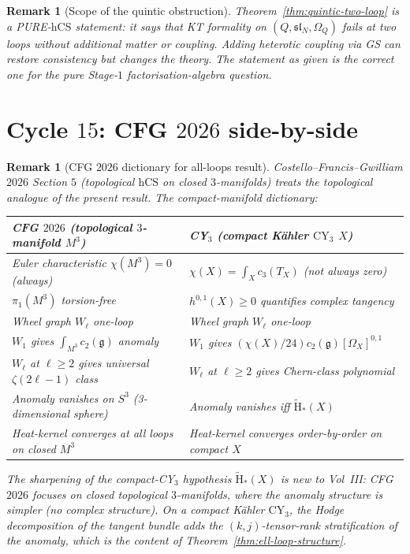 \documentclass[11pt]{article}
\newtheorem{remark}[theorem]{Remark}
\providecommand{\CY}{\mathrm{CY}}
\providecommand{\hCS}{\mathrm{hCS}}
\providecommand{\Om}{\Omega}
\providecommand{\fg}{\mathfrak{g}}
\begin{document}
\begin{remark}[Scope of the quintic obstruction]
\label{rem:quintic-obstruction-scope}
Theorem~\ref{thm:quintic-two-loop} is a PURE-$\hCS$ statement:
it says that KT formality on $(Q, \mathfrak{sl}_N, \Om_Q)$ fails
at two loops without additional matter or coupling.  Adding
heterotic coupling via GS can restore consistency but changes
the theory.  The statement as given is the correct one for the
pure Stage-$1$ factorisation-algebra question.
\end{remark}

\section{Cycle $15$:  CFG $2026$ side-by-side}
\label{sec:cycle-15-cfg}

\begin{remark}[CFG $2026$ dictionary for all-loops result]
\label{rem:cfg-all-loops-dictionary}
Costello--Francis--Gwilliam $2026$ Section $5$ (topological
$\hCS$ on closed $3$-manifolds) treats the topological analogue
of the present result.  The compact-manifold dictionary:
\begin{center}
\begin{tabular}{ll}
CFG $2026$ (topological $3$-manifold $M^3$) & CY$_3$ (compact K\"ahler $\CY_3$ $X$)\\ \hline
Euler characteristic $\chi(M^3) = 0$ (always) & $\chi(X) = \int_X c_3(T_X)$ (not always zero)\\
$\pi_1(M^3)$ torsion-free & $h^{0,1}(X) \geq 0$ quantifies complex tangency\\
Wheel graph $W_\ell$ one-loop & Wheel graph $W_\ell$ one-loop\\
$W_1$ gives $\int_{M^3} c_2(\fg)$ anomaly & $W_1$ gives $(\chi(X)/24) c_2(\fg) [\Om_X]^{0,1}$\\
$W_\ell$ at $\ell \geq 2$ gives universal $\zeta(2\ell-1)$ class & $W_\ell$ at $\ell \geq 2$ gives Chern-class polynomial\\
Anomaly vanishes on $S^3$ (3-dimensional sphere) & Anomaly vanishes iff $\widetilde{\mathrm{H}}_*(X)$\\
Heat-kernel converges at all loops on closed $M^3$ & Heat-kernel converges order-by-order on compact $X$\\
\end{tabular}
\end{center}

The sharpening of the compact-CY$_3$ hypothesis
$\widetilde{\mathrm{H}}_*(X)$ is new to Vol~III: CFG $2026$ focuses
on closed topological $3$-manifolds, where the anomaly structure
is simpler (no complex structure).  On a compact K\"ahler $\CY_3$,
the Hodge decomposition of the tangent bundle adds the
$(k, j)$-tensor-rank stratification of the anomaly, which is the
content of Theorem~\ref{thm:ell-loop-structure}.
\end{remark}
\end{document}
